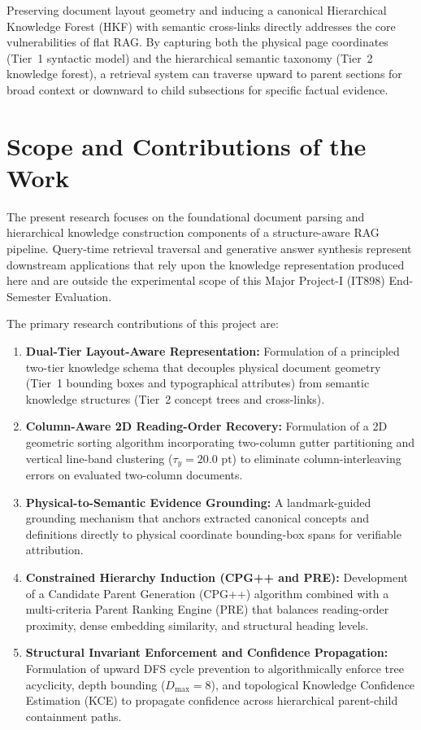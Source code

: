 \documentclass[12pt,a4paper]{report}
\begin{document}
Preserving document layout geometry and inducing a canonical Hierarchical Knowledge Forest (HKF) with semantic cross-links directly addresses the core vulnerabilities of flat RAG. By capturing both the physical page coordinates (Tier~1 syntactic model) and the hierarchical semantic taxonomy (Tier~2 knowledge forest), a retrieval system can traverse upward to parent sections for broad context or downward to child subsections for specific factual evidence.

\section{Scope and Contributions of the Work}
The present research focuses on the foundational document parsing and hierarchical knowledge construction components of a structure-aware RAG pipeline. Query-time retrieval traversal and generative answer synthesis represent downstream applications that rely upon the knowledge representation produced here and are outside the experimental scope of this Major Project-I (IT898) End-Semester Evaluation.

The primary research contributions of this project are:
\begin{enumerate}
    \item \textbf{Dual-Tier Layout-Aware Representation:} Formulation of a principled two-tier knowledge schema that decouples physical document geometry (Tier~1 bounding boxes and typographical attributes) from semantic knowledge structures (Tier~2 concept trees and cross-links).
    \item \textbf{Column-Aware 2D Reading-Order Recovery:} Formulation of a 2D geometric sorting algorithm incorporating two-column gutter partitioning and vertical line-band clustering ($\tau_y = 20.0\text{ pt}$) to eliminate column-interleaving errors on evaluated two-column documents.
    \item \textbf{Physical-to-Semantic Evidence Grounding:} A landmark-guided grounding mechanism that anchors extracted canonical concepts and definitions directly to physical coordinate bounding-box spans for verifiable attribution.
    \item \textbf{Constrained Hierarchy Induction (CPG++ and PRE):} Development of a Candidate Parent Generation (CPG++) algorithm combined with a multi-criteria Parent Ranking Engine (PRE) that balances reading-order proximity, dense embedding similarity, and structural heading levels.
    \item \textbf{Structural Invariant Enforcement and Confidence Propagation:} Formulation of upward DFS cycle prevention to algorithmically enforce tree acyclicity, depth bounding ($D_{\max} = 8$), and topological Knowledge Confidence Estimation (KCE) to propagate confidence across hierarchical parent-child containment paths.
\end{enumerate}
\end{document}
